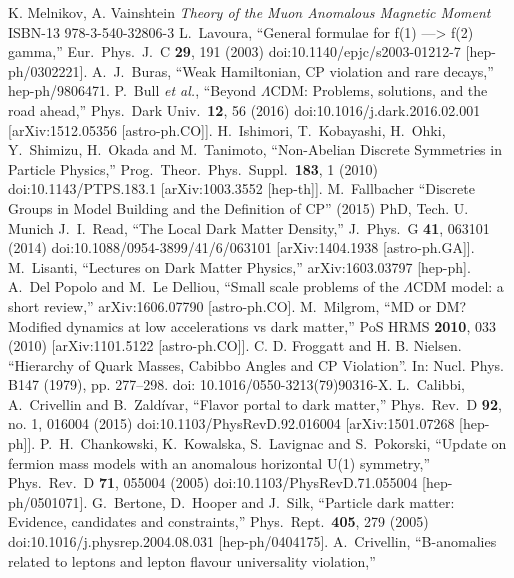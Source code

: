 \begin{thebibliography}{xxx}
K. Melnikov, A. Vainshtein \textit{Theory of the Muon Anomalous Magnetic Moment} ISBN-13 978-3-540-32806-3
  L.~Lavoura,
  ``General formulae for f(1) ---> f(2) gamma,''
  Eur.\ Phys.\ J.\ C {\bf 29}, 191 (2003)
  doi:10.1140/epjc/s2003-01212-7
  [hep-ph/0302221]. 
  A.~J.~Buras,
  ``Weak Hamiltonian, CP violation and rare decays,''
  hep-ph/9806471.
  P.~Bull {\it et al.},
  ``Beyond $\Lambda$CDM: Problems, solutions, and the road ahead,''
  Phys.\ Dark Univ.\  {\bf 12}, 56 (2016)
  doi:10.1016/j.dark.2016.02.001
  [arXiv:1512.05356 [astro-ph.CO]].
    H.~Ishimori, T.~Kobayashi, H.~Ohki, Y.~Shimizu, H.~Okada and M.~Tanimoto,
  ``Non-Abelian Discrete Symmetries in Particle Physics,''
  Prog.\ Theor.\ Phys.\ Suppl.\  {\bf 183}, 1 (2010)
  doi:10.1143/PTPS.183.1
  [arXiv:1003.3552 [hep-th]].
   M.~Fallbacher ``Discrete Groups in Model Building and the Definition of CP'' (2015) PhD, Tech. U. Munich
  J.~I.~Read,
  ``The Local Dark Matter Density,''
  J.\ Phys.\ G {\bf 41}, 063101 (2014)
  doi:10.1088/0954-3899/41/6/063101
  [arXiv:1404.1938 [astro-ph.GA]].
  M.~Lisanti,
  ``Lectures on Dark Matter Physics,''
  arXiv:1603.03797 [hep-ph].
  A.~Del Popolo and M.~Le Delliou,
  ``Small scale problems of the $\Lambda$CDM model: a short review,''
  arXiv:1606.07790 [astro-ph.CO].
  M.~Milgrom,
  ``MD or DM? Modified dynamics at low accelerations vs dark matter,''
  PoS HRMS {\bf 2010}, 033 (2010)
  [arXiv:1101.5122 [astro-ph.CO]].
  C. D. Froggatt and H. B. Nielsen.
“Hierarchy of Quark Masses, Cabibbo Angles and CP Violation”.
In: Nucl. Phys. B147 (1979), pp. 277–298.
doi: 10.1016/0550-3213(79)90316-X.
  L.~Calibbi, A.~Crivellin and B.~Zaldívar,
  ``Flavor portal to dark matter,''
  Phys.\ Rev.\ D {\bf 92}, no. 1, 016004 (2015)
  doi:10.1103/PhysRevD.92.016004
  [arXiv:1501.07268 [hep-ph]].
   P.~H.~Chankowski, K.~Kowalska, S.~Lavignac and S.~Pokorski,
  ``Update on fermion mass models with an anomalous horizontal U(1) symmetry,''
  Phys.\ Rev.\ D {\bf 71}, 055004 (2005)
  doi:10.1103/PhysRevD.71.055004
  [hep-ph/0501071].
  G.~Bertone, D.~Hooper and J.~Silk,
  ``Particle dark matter: Evidence, candidates and constraints,''
  Phys.\ Rept.\  {\bf 405}, 279 (2005)
  doi:10.1016/j.physrep.2004.08.031
  [hep-ph/0404175].
  A.~Crivellin,
  ``B-anomalies related to leptons and lepton flavour universality violation,''

\end{thebibliography}
